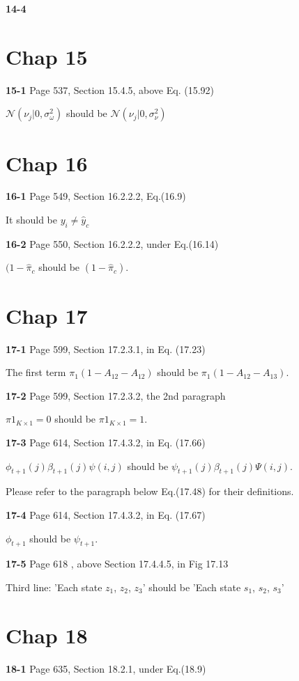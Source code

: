 \documentclass[aps,preprint,a4]{revtex4-1}
\begin{document}
{\color{red}\textbf{14-4}}


\section{Chap 15}
{\color{red}\textbf{15-1}} Page 537, Section 15.4.5, above Eq. (15.92)

$\mathcal N(\nu_{j}|0,\sigma_{\omega}^{2})$ should be $\mathcal N(\nu_{j}|0,\sigma_{\nu}^{2})$


\section{Chap 16}
{\color{red}\textbf{16-1}} Page 549, Section 16.2.2.2, Eq.(16.9)

It should be $y_{i} \neq \hat{y}_{c}$

{\color{red}\textbf{16-2}} Page 550, Section 16.2.2.2, under Eq.(16.14)

$(1-\hat {\pi}_{c}$ should be $(1-\hat {\pi}_{c})$.


\section{Chap 17}
{\color{red}\textbf{17-1}} Page 599, Section 17.2.3.1, in Eq. (17.23)

The first term $\pi_{1}(1-A_{12}-A_{12})$ should be $\pi_{1}(1-A_{12}-A_{13})$.

{\color{red}\textbf{17-2}} Page 599, Section 17.2.3.2, the 2nd paragraph

$\pi 1_{K\times 1}=0$ should be $\pi 1_{K\times 1}=1$.

{\color{red}\textbf{17-3}} Page 614, Section 17.4.3.2, in Eq. (17.66)

$\phi_{t+1}(j)\beta_{t+1}(j)\psi(i,j)$ should be $\psi_{t+1}(j)\beta_{t+1}(j)\Psi(i,j)$.

Please refer to the paragraph below Eq.(17.48) for their definitions.

{\color{red}\textbf{17-4}} Page 614, Section 17.4.3.2, in Eq. (17.67)

$\phi_{t+1}$ should be $\psi_{t+1}$.

{\color{red}\textbf{17-5}} Page 618 , above Section 17.4.4.5, in Fig 17.13

Third line: 'Each state $z_{1}$, $z_{2}$, $z_{3}$' should be 'Each state $s_{1}$, $s_{2}$, $s_{3}$'


\section{Chap 18}
{\color{red}\textbf{18-1}} Page 635, Section 18.2.1, under Eq.(18.9)
\end{document}

